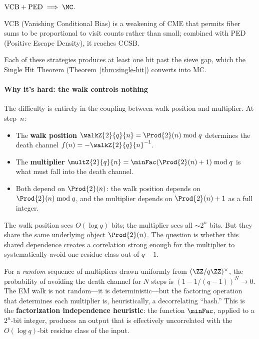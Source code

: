 \begin{theorem}
\label{thm:vcb-ped-mc-intro}
$\mathrm{VCB} + \mathrm{PED} \;\Longrightarrow\; \MC$.
\end{theorem}

VCB (Vanishing Conditional Bias) is a weakening of CME that permits
fiber sums to be proportional to visit counts rather than small;
combined with PED (Positive Escape Density), it reaches CCSB\@.

Each of these strategies produces at least one hit past the sieve gap,
which the Single Hit Theorem (Theorem~\ref{thm:single-hit}) converts
into MC\@.

\paragraph{Why it's hard: the walk controls nothing}

The difficulty is entirely in the coupling between walk position and
multiplier.  At step~$n$:

\begin{itemize}[nosep]
\item The \textbf{walk position} $\walkZ{2}{q}{n} = \Prod{2}(n) \bmod q$
  determines the death channel $f(n) = -\walkZ{2}{q}{n}^{-1}$.
\item The \textbf{multiplier}
  $\multZ{2}{q}{n} = \minFac(\Prod{2}(n)+1) \bmod q$ is what must fall
  into the death channel.
\item Both depend on $\Prod{2}(n)$: the walk position depends on
  $\Prod{2}(n) \bmod q$, and the multiplier depends on $\Prod{2}(n)+1$ as
  a full integer.
\end{itemize}

The walk position sees $O(\log q)$ bits; the multiplier sees all
$\sim 2^n$ bits.  But they share the same underlying object
$\Prod{2}(n)$.  The question is whether this shared dependence creates a
correlation strong enough for the multiplier to systematically avoid
one residue class out of $q-1$.

For a \emph{random} sequence of multipliers drawn uniformly from
$(\ZZ/q\ZZ)^\times$, the probability of avoiding the death channel
for $N$ steps is $(1 - 1/(q-1))^N \to 0$.  The EM walk is not
random---it is deterministic---but the factoring operation that
determines each multiplier is, heuristically, a decorrelating ``hash.''
This is the \textbf{factorization independence heuristic}: the
function $\minFac$, applied to a $2^n$-bit integer, produces an
output that is effectively uncorrelated with the $O(\log q)$-bit
residue class of the input.

